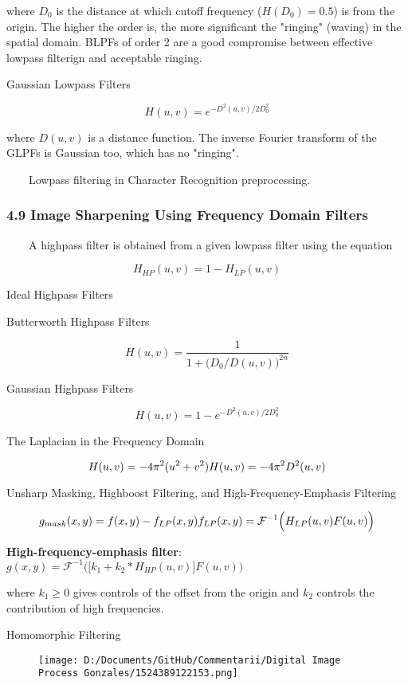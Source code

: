 \documentclass[]{article}
\begin{document}
where \(D_0\) is the distance at which cutoff frequency (\(H(D_0)=0.5\))
is from the origin. The higher the order is, the more significant the
"ringing" (waving) in the spatial domain. BLPFs of order 2 are a good
compromise between effective lowpass filterign and acceptable ringing.

Gaussian Lowpass Filters

\[H(u,v)=e^{-D^2(u,v)/2D_0^2}\]

where \(D(u,v)\) is a distance function. The inverse Fourier transform
of the GLPFs is Gaussian too, which has no "ringing".

\(\quad\quad\)Lowpass filtering in Character Recognition preprocessing.

\subsubsection{4.9 Image Sharpening Using Frequency Domain
Filters}\label{header-n574}

\(\quad\quad\)A highpass filter is obtained from a given lowpass filter
using the equation

\[H_{HP}(u,v)=1-H_{LP}(u,v)\]

Ideal Highpass Filters

Butterworth Highpass Filters

\[H(u,v)=\dfrac{1}{1+\big(D_0/D(u,v)\big)^{2n}}\]

Gaussian Highpass Filters

\[H(u,v)=1-e^{-D^2(u,v)/2D_0^2}\]

The Laplacian in the Frequency Domain

\[H(u,v)=-4\pi^2(u^2+v^2)\\
H(u,v)=-4\pi^2D^2(u,v)\]

Unsharp Masking, Highboost Filtering, and High-Frequency-Emphasis
Filtering

\[g_{mask}(x,y)=f(x,y)-f_{LP}(x,y)\\
f_{LP}(x,y)=\mathcal{F}^{-1}\Big(H_{LP}(u,v)F(u,v)\Big)\]

\textbf{High-frequency-emphasis filter}:
\(g(x,y)=\mathcal{F}^{-1}\Bigg(\Big[k_1+k_2*H_{HP}(u,v)\Big]F(u,v)\Bigg)\)

where \(k_1\geq 0 \) gives controls of the offset from the origin and
\(k_2\) controls the contribution of high frequencies.

Homomorphic Filtering

\begin{figure}
\centering
\texttt{[image: D:/Documents/GitHub/Commentarii/Digital Image Process Gonzales/1524389122153.png]}
\caption{}
\end{figure}
\end{document}
